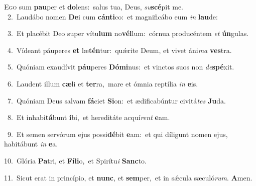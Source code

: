 \lettrine{\initial\textcolor{\initialcolor}{E}}{go} sum \textbf{pau}\-per et \textbf{do}\-lens:~\star salus tua, Deus, \textit{su}\-\textbf{scé}pit me.\\
{\numbfont\textcolor{\numbcolor}{~2.}}~Laudábo nomen \textbf{De}\-i cum \textbf{cán}\-\textbf{ti}co:~\star et magnificábo eum \textit{in} \textbf{lau}\-de:\par
{\numbfont\textcolor{\numbcolor}{~3.}}~Et placébit Deo super vítu\textbf{lum} no\-\textbf{vél}\-lum:~\star córnua producéntem \textit{et} \textbf{ún}\-gulas.\par
{\numbfont\textcolor{\numbcolor}{~4.}}~Vídeant páuperes \textbf{et} læ\-\textbf{tén}\-tur:~\star quǽrite Deum, et vivet áni\textit{ma} \textbf{ves}\-tra.\par
{\numbfont\textcolor{\numbcolor}{~5.}}~Quóniam exaudívit \textbf{páu}\-peres \textbf{Dó}\-\textbf{mi}nus:~\star et vinctos suos non \textit{de}\-\textbf{spé}xit.\par
{\numbfont\textcolor{\numbcolor}{~6.}}~Laudent illum \textbf{cæ}\-li et \textbf{ter}\-ra,~\star mare et ómnia reptília \textit{in} \textbf{e}\-is.\par
{\numbfont\textcolor{\numbcolor}{~7.}}~Quóniam Deus salvam \textbf{fá}\-ciet \textbf{Si}\-on:~\star et ædificabúntur civitá\textit{tes} \textbf{Ju}\-da.\par
{\numbfont\textcolor{\numbcolor}{~8.}}~Et inhabi\-\textbf{tá}\-bunt \textbf{i}\-bi,~\star et hereditáte acquí\textit{rent} \textbf{e}\-am.\par
{\numbfont\textcolor{\numbcolor}{~9.}}~Et semen servórum ejus possi\-\textbf{dé}\-bit \textbf{e}\-am:~\star et qui díligunt nomen ejus, habitábunt \textit{in} \textbf{e}\-a.\par
{\numbfont\textcolor{\numbcolor}{10.}}~Glória \textbf{Pa}\-tri, et \textbf{Fí}\-\textbf{li}o,~\star et Spirítu\textit{i} \textbf{Sanc}\-to.\par
{\numbfont\textcolor{\numbcolor}{11.}}~Sicut erat in princípio, et \textbf{nunc}\-, et \textbf{sem}\-per,~\star et in sǽcula sæculó\-\textit{rum}\-. \textbf{A}\-men.\par

